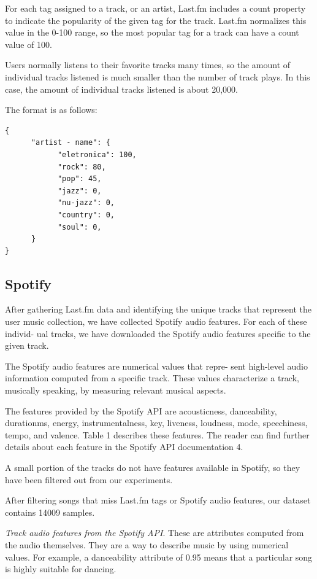 \documentclass[sn-mathphys]{sn-jnl}%
\theoremstyle{thmstyleone}%
\theoremstyle{thmstyletwo}%
\theoremstyle{thmstylethree}%
\begin{document}
For each tag assigned to a track, or an artist, Last.fm includes
a count property to indicate the popularity of the given tag for the track.
Last.fm normalizes this value in the 0-100 range, so the most popular tag for a track can have a
count value of 100.

Users normally listens to their favorite tracks many times,
so the amount of individual tracks listened is much smaller
than the number of track plays. In this case, the amount of
individual tracks listened is about 20,000.

The format is as follows:

\begin{verbatim}
{
      "artist - name": {
            "eletronica": 100,
            "rock": 80,
            "pop": 45,
            "jazz": 0,
            "nu-jazz": 0,
            "country": 0,
            "soul": 0,
      }
}
\end{verbatim}


\subsection{Spotify}

After gathering Last.fm data and identifying the unique
tracks that represent the user music collection, we have
collected Spotify audio features. For each of these individ-
ual tracks, we have downloaded the Spotify audio features
specific to the given track.

The Spotify audio features are numerical values that repre-
sent high-level audio information computed from a specific
track. These values characterize a track, musically speaking,
by measuring relevant musical aspects.

The features provided by the Spotify API are acousticness,
danceability, duration\textunderscore ms, energy, instrumentalness, key,
liveness, loudness, mode, speechiness, tempo, and valence.
Table 1 describes these features. The reader can find further
details about each feature in the Spotify API documentation
4.

A small portion of the tracks do not have features available in
Spotify, so they have been filtered out from our experiments.

After filtering songs that miss Last.fm tags or Spotify audio features,
our dataset contains 14009 samples.

\emph{Track audio features from the Spotify API}. These are
attributes computed from the audio themselves. They
are a way to describe music by using numerical values.
For example, a danceability attribute of 0.95 means
that a particular song is highly suitable for dancing.
\end{document}
